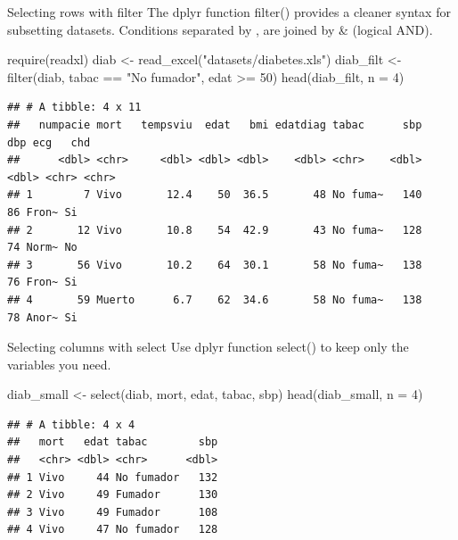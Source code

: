 \documentclass[
  ignorenonframetext,
]{beamer}
\newenvironment{Shaded}{\begin{snugshade}}{\end{snugshade}}
\newcommand{\AttributeTok}[1]{\textcolor[rgb]{0.77,0.63,0.00}{#1}}
\newcommand{\DecValTok}[1]{\textcolor[rgb]{0.00,0.00,0.81}{#1}}
\newcommand{\FunctionTok}[1]{\textcolor[rgb]{0.00,0.00,0.00}{#1}}
\newcommand{\NormalTok}[1]{#1}
\newcommand{\OtherTok}[1]{\textcolor[rgb]{0.56,0.35,0.01}{#1}}
\newcommand{\SpecialCharTok}[1]{\textcolor[rgb]{0.00,0.00,0.00}{#1}}
\newcommand{\StringTok}[1]{\textcolor[rgb]{0.31,0.60,0.02}{#1}}
\begin{document}
\begin{frame}[fragile]{Selecting rows with filter}
\protect\hypertarget{selecting-rows-with-filter}{}
The dplyr function filter() provides a cleaner syntax for subsetting
datasets. Conditions separated by , are joined by \& (logical AND).

\footnotesize

\begin{Shaded}
\begin{Highlighting}[]
\FunctionTok{require}\NormalTok{(readxl)}
\NormalTok{diab }\OtherTok{\textless{}{-}} \FunctionTok{read\_excel}\NormalTok{(}\StringTok{"datasets/diabetes.xls"}\NormalTok{)}
\NormalTok{diab\_filt }\OtherTok{\textless{}{-}} \FunctionTok{filter}\NormalTok{(diab, tabac }\SpecialCharTok{==} \StringTok{"No fumador"}\NormalTok{, edat }\SpecialCharTok{\textgreater{}=} \DecValTok{50}\NormalTok{)}
\FunctionTok{head}\NormalTok{(diab\_filt, }\AttributeTok{n =} \DecValTok{4}\NormalTok{)}
\end{Highlighting}
\end{Shaded}

\begin{verbatim}
## # A tibble: 4 x 11
##   numpacie mort   tempsviu  edat   bmi edatdiag tabac      sbp   dbp ecg   chd  
##      <dbl> <chr>     <dbl> <dbl> <dbl>    <dbl> <chr>    <dbl> <dbl> <chr> <chr>
## 1        7 Vivo       12.4    50  36.5       48 No fuma~   140    86 Fron~ Si   
## 2       12 Vivo       10.8    54  42.9       43 No fuma~   128    74 Norm~ No   
## 3       56 Vivo       10.2    64  30.1       58 No fuma~   138    76 Fron~ Si   
## 4       59 Muerto      6.7    62  34.6       58 No fuma~   138    78 Anor~ Si
\end{verbatim}

\normalsize
\end{frame}

\begin{frame}[fragile]{Selecting columns with select}
\protect\hypertarget{selecting-columns-with-select}{}
Use dplyr function select() to keep only the variables you need.

\footnotesize

\begin{Shaded}
\begin{Highlighting}[]
\NormalTok{diab\_small }\OtherTok{\textless{}{-}} \FunctionTok{select}\NormalTok{(diab, mort, edat, tabac, sbp)}
\FunctionTok{head}\NormalTok{(diab\_small, }\AttributeTok{n =} \DecValTok{4}\NormalTok{)}
\end{Highlighting}
\end{Shaded}

\begin{verbatim}
## # A tibble: 4 x 4
##   mort   edat tabac        sbp
##   <chr> <dbl> <chr>      <dbl>
## 1 Vivo     44 No fumador   132
## 2 Vivo     49 Fumador      130
## 3 Vivo     49 Fumador      108
## 4 Vivo     47 No fumador   128
\end{verbatim}

\normalsize
\end{frame}
\end{document}
